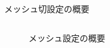 \begin{frame}{メッシュ切設定の概要}
\begin{columns}[t]
\begin{column}{0.4\textwidth}
\begin{figure}[htbp]
\begin{center}
\begin{overlayarea}{7cm}{15cm}
            \caption{メッシュ設定の概要}
          \end{overlayarea}
        \end{center}

\end{figure}
\end{column}
\end{columns}
\end{frame}

